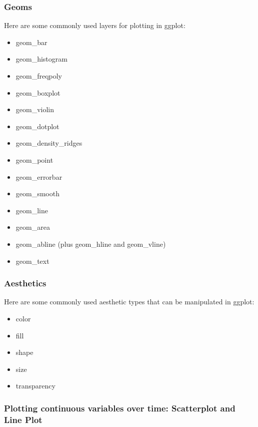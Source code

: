 \documentclass[
]{article}
\providecommand{\tightlist}{%
  \setlength{\itemsep}{0pt}\setlength{\parskip}{0pt}}
\begin{document}
\hypertarget{geoms}{%
\subsubsection{Geoms}\label{geoms}}

Here are some commonly used layers for plotting in ggplot:

\begin{itemize}
\tightlist
\item
  geom\_bar
\item
  geom\_histogram
\item
  geom\_freqpoly
\item
  geom\_boxplot
\item
  geom\_violin
\item
  geom\_dotplot
\item
  geom\_density\_ridges
\item
  geom\_point
\item
  geom\_errorbar
\item
  geom\_smooth
\item
  geom\_line
\item
  geom\_area
\item
  geom\_abline (plus geom\_hline and geom\_vline)
\item
  geom\_text
\end{itemize}

\hypertarget{aesthetics}{%
\subsubsection{Aesthetics}\label{aesthetics}}

Here are some commonly used aesthetic types that can be manipulated in
ggplot:

\begin{itemize}
\tightlist
\item
  color
\item
  fill
\item
  shape
\item
  size
\item
  transparency
\end{itemize}

\hypertarget{plotting-continuous-variables-over-time-scatterplot-and-line-plot}{%
\subsubsection{Plotting continuous variables over time: Scatterplot and
Line
Plot}\label{plotting-continuous-variables-over-time-scatterplot-and-line-plot}}
\end{document}
